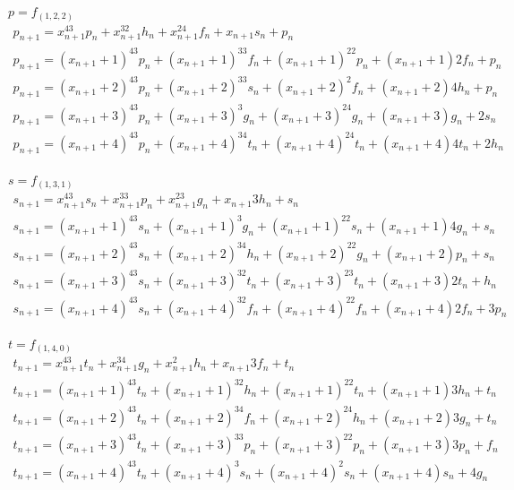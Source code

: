 \documentclass[a4paper, 14pt]{extarticle}
\begin{document}
$p=f_{(1,2,2)}$
$$
\begin{array}{l}
p_{n+1} = x_{n+1}^43p_{n} + x_{n+1}^32h_{n} + x_{n+1}^24f_{n} + x_{n+1}s_{n} + p_{n} \\
p_{n+1} = (x_{n+1}+1)^43p_{n} + (x_{n+1}+1)^33f_{n} + (x_{n+1}+1)^22p_{n} + (x_{n+1}+1)2f_{n} + p_{n} \\
p_{n+1} = (x_{n+1}+2)^43p_{n} + (x_{n+1}+2)^33s_{n} + (x_{n+1}+2)^2f_{n} + (x_{n+1}+2)4h_{n} + p_{n} \\
p_{n+1} = (x_{n+1}+3)^43p_{n} + (x_{n+1}+3)^3g_{n} + (x_{n+1}+3)^24g_{n} + (x_{n+1}+3)g_{n} + 2s_{n} \\
p_{n+1} = (x_{n+1}+4)^43p_{n} + (x_{n+1}+4)^34t_{n} + (x_{n+1}+4)^24t_{n} + (x_{n+1}+4)4t_{n} + 2h_{n} \\
\end{array}
$$

$s=f_{(1,3,1)}$
$$
\begin{array}{l}
s_{n+1} = x_{n+1}^43s_{n} + x_{n+1}^33p_{n} + x_{n+1}^23g_{n} + x_{n+1}3h_{n} + s_{n} \\
s_{n+1} = (x_{n+1}+1)^43s_{n} + (x_{n+1}+1)^3g_{n} + (x_{n+1}+1)^22s_{n} + (x_{n+1}+1)4g_{n} + s_{n} \\
s_{n+1} = (x_{n+1}+2)^43s_{n} + (x_{n+1}+2)^34h_{n} + (x_{n+1}+2)^22g_{n} + (x_{n+1}+2)p_{n} + s_{n} \\
s_{n+1} = (x_{n+1}+3)^43s_{n} + (x_{n+1}+3)^32t_{n} + (x_{n+1}+3)^23t_{n} + (x_{n+1}+3)2t_{n} + h_{n} \\
s_{n+1} = (x_{n+1}+4)^43s_{n} + (x_{n+1}+4)^32f_{n} + (x_{n+1}+4)^22f_{n} + (x_{n+1}+4)2f_{n} + 3p_{n} \\
\end{array}
$$

$t=f_{(1,4,0)}$
$$
\begin{array}{l}
t_{n+1} = x_{n+1}^43t_{n} + x_{n+1}^34g_{n} + x_{n+1}^2h_{n} + x_{n+1}3f_{n} + t_{n} \\
t_{n+1} = (x_{n+1}+1)^43t_{n} + (x_{n+1}+1)^32h_{n} + (x_{n+1}+1)^22t_{n} + (x_{n+1}+1)3h_{n} + t_{n} \\
t_{n+1} = (x_{n+1}+2)^43t_{n} + (x_{n+1}+2)^34f_{n} + (x_{n+1}+2)^24h_{n} + (x_{n+1}+2)3g_{n} + t_{n} \\
t_{n+1} = (x_{n+1}+3)^43t_{n} + (x_{n+1}+3)^33p_{n} + (x_{n+1}+3)^22p_{n} + (x_{n+1}+3)3p_{n} + f_{n} \\
t_{n+1} = (x_{n+1}+4)^43t_{n} + (x_{n+1}+4)^3s_{n} + (x_{n+1}+4)^2s_{n} + (x_{n+1}+4)s_{n} + 4g_{n} \\
\end{array}
$$
\end{document}
